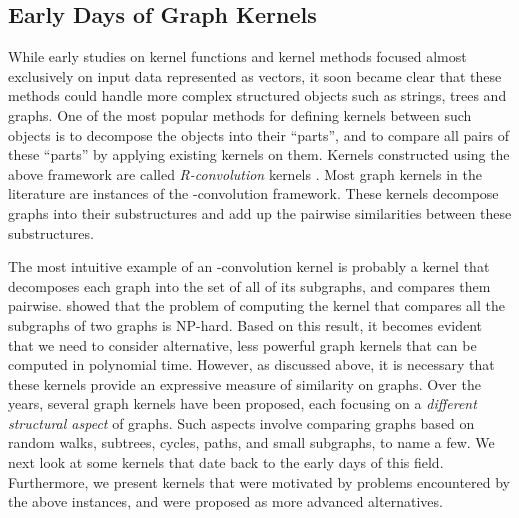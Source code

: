 \documentclass[twoside,11pt]{article}
\begin{document}
\subsection{Early Days of Graph Kernels}
While early studies on kernel functions and kernel methods focused almost exclusively on input data represented as vectors, it soon became clear that these methods could handle more complex structured objects such as strings, trees and graphs.
One of the most popular methods for defining kernels between such objects is to decompose the objects into their ``parts'', and to compare all pairs of these ``parts'' by applying existing kernels on them.
Kernels constructed using the above framework are called \textit{R-convolution} kernels .
Most graph kernels in the literature are instances of the -convolution framework.
These kernels decompose graphs into their substructures and add up the pairwise similarities between these substructures.

The most intuitive example of an -convolution kernel is probably a kernel that decomposes each graph into the set of all of its subgraphs, and compares them pairwise.
 showed that the problem of computing the kernel that compares all the subgraphs of two graphs is NP-hard.
Based on this result, it becomes evident that we need to consider alternative, less powerful graph kernels that can be computed in polynomial time.
However, as discussed above, it is necessary that these kernels provide an expressive measure of similarity on graphs.
Over the years,  several graph kernels have been proposed, each focusing on a \textit{different structural aspect} of graphs.
Such aspects involve comparing graphs based on random walks, subtrees, cycles, paths, and small subgraphs, to name a few.
We next look at some kernels that date back to the early days of this field.
Furthermore, we present kernels that were motivated by problems encountered by the above instances, and were proposed as more advanced alternatives. 
\end{document}
